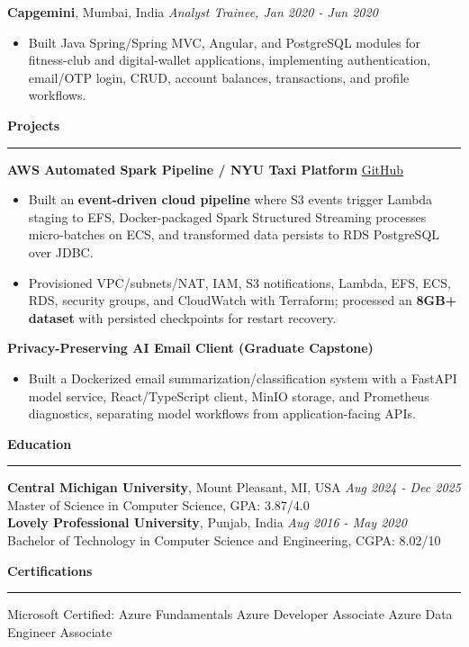 \documentclass[11pt,letterpaper]{article}
\newcommand{\ressection}[1]{\Needspace{6\baselineskip}\vspace{8pt}\par\textbf{#1}\par\vspace{2pt}\hrule\vspace{5pt}}
\begin{document}
\textbf{Capgemini}, Mumbai, India \hfill \textit{Analyst Trainee, Jan 2020 - Jun 2020}
\begin{itemize}
  \item Built Java Spring/Spring MVC, Angular, and PostgreSQL modules for fitness-club and digital-wallet applications, implementing authentication, email/OTP login, CRUD, account balances, transactions, and profile workflows.
\end{itemize}

\ressection{Projects}
\textbf{AWS Automated Spark Pipeline / NYU Taxi Platform} \hfill \href{https://github.com/preferablehuman/AWS-automated-spark-pipeline}{GitHub}
\begin{itemize}
  \item Built an \textbf{event-driven cloud pipeline} where S3 events trigger Lambda staging to EFS, Docker-packaged Spark Structured Streaming processes micro-batches on ECS, and transformed data persists to RDS PostgreSQL over JDBC.
  \item Provisioned VPC/subnets/NAT, IAM, S3 notifications, Lambda, EFS, ECS, RDS, security groups, and CloudWatch with Terraform; processed an \textbf{8GB+ dataset} with persisted checkpoints for restart recovery.
\end{itemize}
\vspace{2pt}
\textbf{Privacy-Preserving AI Email Client (Graduate Capstone)}
\begin{itemize}
  \item Built a Dockerized email summarization/classification system with a FastAPI model service, React/TypeScript client, MinIO storage, and Prometheus diagnostics, separating model workflows from application-facing APIs.
\end{itemize}

\ressection{Education}
\textbf{Central Michigan University}, Mount Pleasant, MI, USA \hfill \textit{Aug 2024 - Dec 2025}\\
Master of Science in Computer Science, GPA: 3.87/4.0\\
\textbf{Lovely Professional University}, Punjab, India \hfill \textit{Aug 2016 - May 2020}\\
Bachelor of Technology in Computer Science and Engineering, CGPA: 8.02/10

\ressection{Certifications}
Microsoft Certified: Azure Fundamentals \textbar{} Azure Developer Associate \textbar{} Azure Data Engineer Associate
\end{document}
